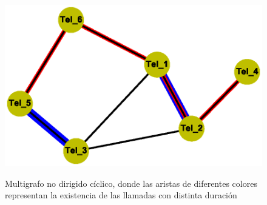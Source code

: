 \documentclass{article}
\begin{document}
\begin{center}

\end{center}
\begin{figure}[h]
\begin{center}
\includegraphics[scale=0.7]{Graf8.eps}\\
\caption{Multigrafo no dirigido cíclico, donde las aristas de diferentes colores representan la existencia de las llamadas con distinta duración}
\end{center}
\end{figure}
\end{document}

